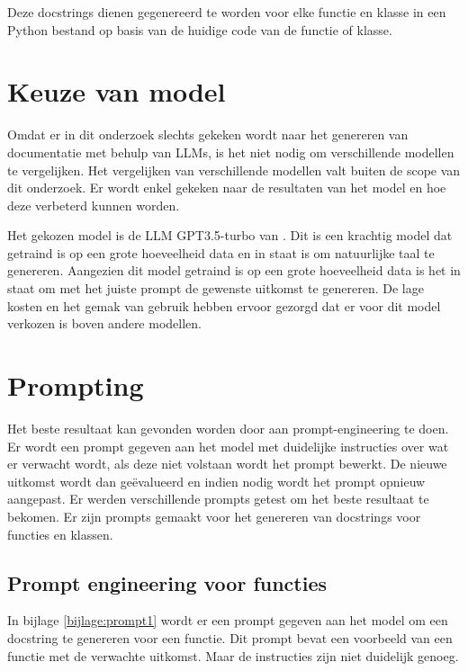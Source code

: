 Deze docstrings dienen gegenereerd te worden voor elke functie en klasse in een Python bestand op basis van de huidige code van de functie of klasse.

\section{Keuze van model}
\label{sec:bestanddocumentatie-model}

Omdat er in dit onderzoek slechts gekeken wordt naar het genereren van documentatie met behulp van LLMs, is het niet nodig om verschillende modellen te vergelijken.
Het vergelijken van verschillende modellen valt buiten de scope van dit onderzoek.
Er wordt enkel gekeken naar de resultaten van het model en hoe deze verbeterd kunnen worden.

Het gekozen model is de LLM GPT3.5-turbo van \textcite{OpenAI}.
Dit is een krachtig model dat getraind is op een grote hoeveelheid data en in staat is om natuurlijke taal te genereren.
Aangezien dit model getraind is op een grote hoeveelheid data is het in staat om met het juiste prompt de gewenste uitkomst te genereren.
De lage kosten en het gemak van gebruik hebben ervoor gezorgd dat er voor dit model verkozen is boven andere modellen.

\section{Prompting}
\label{sec:bestanddocumentatie-prompting}

Het beste resultaat kan gevonden worden door aan prompt-engineering te doen.
Er wordt een prompt gegeven aan het model met duidelijke instructies over wat er verwacht wordt, als deze niet volstaan wordt het prompt bewerkt.
De nieuwe uitkomst wordt dan geëvalueerd en indien nodig wordt het prompt opnieuw aangepast.
Er werden verschillende prompts getest om het beste resultaat te bekomen.
Er zijn prompts gemaakt voor het genereren van docstrings voor functies en klassen. 


\subsection{Prompt engineering voor functies}

In bijlage \ref{bijlage:prompt1} wordt er een prompt gegeven aan het model om een docstring te genereren voor een functie. 
Dit prompt bevat een voorbeeld van een functie met de verwachte uitkomst. 
Maar de instructies zijn niet duidelijk genoeg. 

